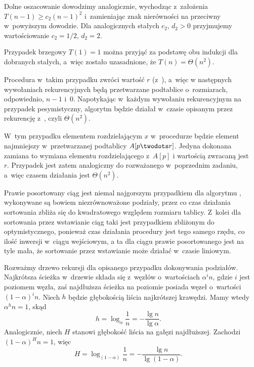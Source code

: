Dolne oszacowanie dowodzimy analogicznie, wychodząc z~założenia $T(n-1)\ge c_2(n-1)^2$ i~zamieniając znak nierówności na przeciwny w~powyższym dowodzie. Dla analogicznych stałych $c_2$, $d_2>0$ przyjmujemy wartościowanie $c_2=1/2$, $d_2=2$.

Przypadek brzegowy $T(1)=1$ można przyjąć za podstawę obu indukcji dla dobranych stałych, a~więc zostało uzasadnione, że $T(n)=\Theta(n^2)$.

\exercise %
Procedura  w~takim przypadku zwróci wartość $r$ (z~), a~więc w następnych wywołaniach rekurencyjnych będą przetwarzane podtablice o~rozmiarach, odpowiednio, $n-1$ i~0. Napotykając w~każdym wywołaniu rekurencyjnym na przypadek pesymistyczny, algorytm będzie działał w~czasie opisanym przez rekurencję z~, czyli $\Theta(n^2)$.

\exercise %
W~tym przypadku elementem rozdzielającym $x$ w~procedurze  będzie element najmniejszy w~przetwarzanej podtablicy $A[p\twodots r]$. Jedyna dokonana zamiana to wymiana elementu rozdzielającego z~$A[p]$ i wartością zwracaną jest $r$. Przypadek jest zatem analogiczny do rozważanego w~poprzednim zadaniu, a~więc czasem działania  jest $\Theta(n^2)$.

\exercise %
Prawie posortowany ciąg jest niemal najgorszym przypadkiem dla algorytmu , wykonywane są bowiem niezrównoważone podziały, przez co czas działania sortowania zbliża się do kwadratowego względem rozmiaru tablicy. Z~kolei dla sortowania przez wstawianie ciąg taki jest przypadkiem zbliżonym do optymistycznego, ponieważ czas działania procedury  jest tego samego rzędu, co ilość inwersji w~ciągu wejściowym, a ta dla ciągu prawie posortowanego jest na tyle mała, że sortowanie przez wstawianie może działać w~czasie liniowym.

\exercise %
Rozważmy drzewo rekursji dla opisanego przypadku dokonywania podziałów. Najkrótsza ścieżka w~drzewie składa się z~węzłów o~wartościach $\alpha^in$, gdzie $i$ jest poziomem węzła, zaś najdłuższa ścieżka na  poziomie posiada węzeł o~wartości $(1-\alpha)^in$. Niech $h$ będzie głębokością liścia najkrótszej krawędzi. Mamy wtedy $\alpha^hn=1$, skąd
\[
	h = \log_\alpha\frac{1}{n} = -\frac{\lg n}{\lg\alpha}.
\]
Analogicznie, niech $H$ stanowi głębokość liścia na gałęzi najdłuższej. Zachodzi $(1-\alpha)^Hn=1$, więc
\[
	H = \log_{(1-\alpha)}\frac{1}{n} = -\frac{\lg n}{\lg(1-\alpha)}.
\]

